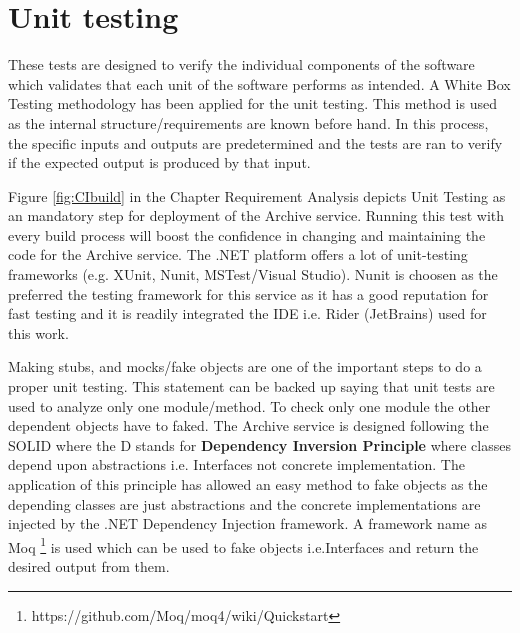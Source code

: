 \section{Unit testing}
These tests are designed to verify the individual components of the software which validates that each unit of the software performs as intended. A White Box
Testing methodology has been applied for the unit testing. This method is used as the internal structure/requirements are known before hand. In this process,
the specific inputs and outputs are predetermined and the tests are ran to verify if the expected output is produced by that input. 

\par
Figure \ref{fig:CIbuild} in the Chapter Requirement Analysis depicts
Unit Testing as an mandatory step for deployment of the Archive service. Running this test with every build process will boost the confidence 
in changing and maintaining the code for the Archive service. The .NET platform offers a lot of unit-testing frameworks 
(e.g. XUnit, Nunit, MSTest/Visual Studio). Nunit is choosen as the preferred the testing framework for this service as it has a good reputation for
fast testing and it is readily integrated the IDE i.e. Rider (JetBrains) used for this work. 

\par
Making stubs, and mocks/fake objects are one of the important steps to do a proper unit testing. This statement can be backed up saying that unit tests are
used to analyze only one module/method. To check only one module the other dependent objects have to faked. The Archive service is designed following the
SOLID \cite{Hotop2015} where the D stands for \textbf{Dependency Inversion Principle} where classes depend upon abstractions i.e. Interfaces not concrete
implementation. The application of this principle has allowed an easy method to fake objects as the depending classes are just abstractions and the concrete 
implementations are injected by the .NET Dependency Injection framework. A framework name as Moq \footnote{https://github.com/Moq/moq4/wiki/Quickstart} is used
which can be used to fake objects i.e.Interfaces and return the desired output from them. 

